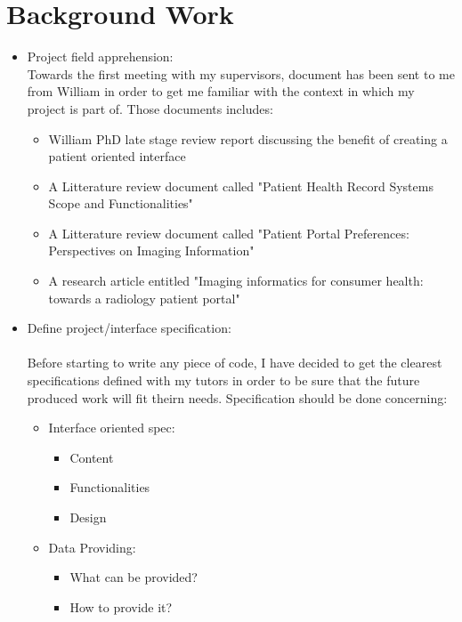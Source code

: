 \documentclass[12pt,twoside]{article}
\begin{document}
\clearpage
\section{Background Work}
\begin{itemize}
\item Project field apprehension: \\
Towards the first meeting with my supervisors, document has been sent to me from William in order to get me familiar with the context in which my project is part of.
Those documents includes:
\begin{itemize}
\item William PhD late stage review report discussing the benefit of creating a patient oriented interface
\item A Litterature review document called "Patient Health Record Systems Scope and Functionalities"
\item A Litterature review document called "Patient Portal Preferences: Perspectives on Imaging Information"
\item A research article entitled "Imaging informatics for consumer health: towards a radiology patient portal"
\end{itemize}
 
\item Define project/interface specification:\\ \\
Before starting to write any piece of code, I have decided to get the clearest specifications defined with my tutors in order to be sure that the future produced work will fit theirn needs. Specification should be done concerning:
\begin{itemize}
\item Interface oriented spec:
\begin{itemize}
\item Content
\item Functionalities
\item Design
\end{itemize}

\item Data Providing:
\begin{itemize} 
\item What can be provided?
\item How to provide it?
\end{itemize}

	
\end{itemize}



\end{itemize}
\end{document}
